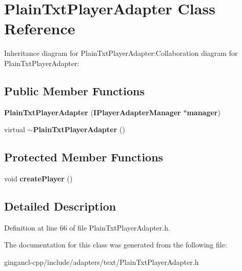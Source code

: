 \section{PlainTxtPlayerAdapter Class Reference}
\label{classbr_1_1pucrio_1_1telemidia_1_1ginga_1_1ncl_1_1adapters_1_1text_1_1PlainTxtPlayerAdapter}
Inheritance diagram for PlainTxtPlayerAdapter:Collaboration diagram for PlainTxtPlayerAdapter:\subsection*{Public Member Functions}
\begin{CompactItemize}
\item 
\textbf{PlainTxtPlayerAdapter} ({\bf IPlayerAdapterManager} $\ast${\bf manager})\label{classbr_1_1pucrio_1_1telemidia_1_1ginga_1_1ncl_1_1adapters_1_1text_1_1PlainTxtPlayerAdapter_f5c3138eecc852aa9e876591835d0b60}

\item 
virtual {\bf $\sim$PlainTxtPlayerAdapter} ()\label{classbr_1_1pucrio_1_1telemidia_1_1ginga_1_1ncl_1_1adapters_1_1text_1_1PlainTxtPlayerAdapter_05fae7e87ebc9f5ee5a77f1ba7054b28}

\end{CompactItemize}
\subsection*{Protected Member Functions}
\begin{CompactItemize}
\item 
void \textbf{createPlayer} ()\label{classbr_1_1pucrio_1_1telemidia_1_1ginga_1_1ncl_1_1adapters_1_1text_1_1PlainTxtPlayerAdapter_2fbb9533e3d66799b0a433c9298ea70f}

\end{CompactItemize}


\subsection{Detailed Description}




Definition at line 66 of file PlainTxtPlayerAdapter.h.

The documentation for this class was generated from the following file:\begin{CompactItemize}
\item 
gingancl-cpp/include/adapters/text/PlainTxtPlayerAdapter.h\end{CompactItemize}
